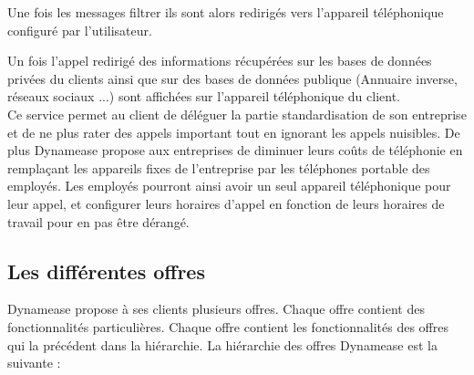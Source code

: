 Une fois les messages filtrer ils sont alors redirigés vers l'appareil téléphonique configuré par l'utilisateur.

Un fois l'appel redirigé des informations récupérées sur les bases de données privées du clients ainsi que sur des bases de données publique (Annuaire inverse, réseaux sociaux ...) sont affichées sur l'appareil téléphonique du client.\\

Ce service permet au client de déléguer la partie standardisation de son entreprise et de ne plus rater des appels important tout en ignorant les appels nuisibles. De plus Dynamease propose aux entreprises de diminuer leurs coûts de téléphonie en remplaçant les appareils fixes de l'entreprise par les téléphones portable des employés. Les employés pourront ainsi avoir un seul appareil téléphonique pour leur appel, et configurer leurs horaires d'appel en fonction de leurs horaires de travail pour en pas être dérangé.

\subsection{Les différentes offres}

Dynamease propose à ses clients plusieurs offres. Chaque offre contient des fonctionnalités particulières. Chaque offre contient les fonctionnalités des offres qui la précédent dans la hiérarchie. La hiérarchie des offres Dynamease est la suivante :

